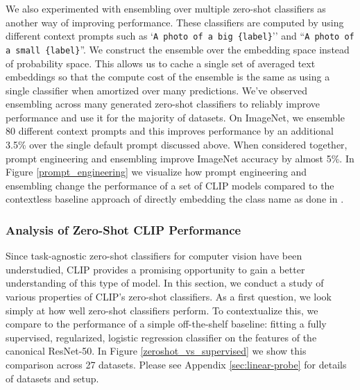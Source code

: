 We also experimented with ensembling over multiple zero-shot classifiers as another way of improving performance. These classifiers are computed by using different context prompts such as `\texttt{A photo of a big \{label\}}'' and ``\texttt{A photo of a small \{label\}}''. We construct the ensemble over the embedding space instead of probability space. This allows us to cache a single set of averaged text embeddings so that the compute cost of the ensemble is the same as using a single classifier when amortized over many predictions. We've observed ensembling across many generated zero-shot classifiers to reliably improve performance and use it for the majority of datasets. On ImageNet, we ensemble 80 different context prompts and this improves performance by an additional 3.5\% over the single default prompt discussed above. When considered together, prompt engineering and ensembling improve ImageNet accuracy by almost 5\%. In Figure \ref{prompt_engineering} we visualize how prompt engineering and ensembling change the performance of a set of CLIP models compared to the contextless baseline approach of directly embedding the class name as done in \citet{li2017learning}. 

\subsubsection{Analysis of Zero-Shot CLIP Performance}

Since task-agnostic zero-shot classifiers for computer vision have been understudied, CLIP provides a promising opportunity to gain a better understanding of this type of model. In this section, we conduct a study of various properties of CLIP's zero-shot classifiers. As a first question, we look simply at how well zero-shot classifiers perform. To contextualize this, we compare to the performance of a simple off-the-shelf baseline: fitting a fully supervised, regularized, logistic regression classifier on the features of the canonical ResNet-50. In Figure \ref{zeroshot_vs_supervised} we show this comparison across 27 datasets. Please see Appendix \ref{sec:linear-probe} for details of datasets and setup. 

